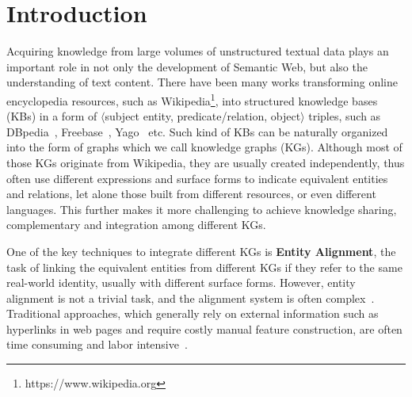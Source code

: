 	
	\section{Introduction}
	\label{section:intro}
	Acquiring knowledge from large volumes of unstructured textual data plays an important role in not only the development of Semantic Web, but also the understanding of text content. There have been many works transforming online encyclopedia resources, such as Wikipedia\footnote{https://www.wikipedia.org}, into structured knowledge bases (KBs) in a form of $\langle$subject entity, predicate/relation, object$\rangle$ triples, such as DBpedia~\cite{Lehmann2009DBpedia,Auer2007DBpedia}, Freebase~\cite{Bollacker2007Freebase}, Yago~\cite{Suchanek2008YAGO} etc.
	Such kind of KBs can be naturally organized into the form of graphs which we call knowledge graphs (KGs). Although most of those KGs originate from Wikipedia, they are usually created independently, thus often use different expressions and surface forms to indicate equivalent entities and relations, let alone those built from different resources, or even different languages. This further makes it more challenging to achieve knowledge sharing, complementary and integration among different KGs.
	
	One of the key techniques to integrate different KGs is \textbf{Entity Alignment}, the task of linking the equivalent entities from different KGs if they refer to the same real-world identity, usually with different surface forms. However, entity alignment is not a trivial task, and the alignment system is often complex~\cite{gokhale2014corleone,scharffe2014ontology}. Traditional approaches, which generally rely on external information such as hyperlinks in web pages and require costly manual feature construction, are often time consuming and labor intensive~\cite{zhu2017iterative}.
	
